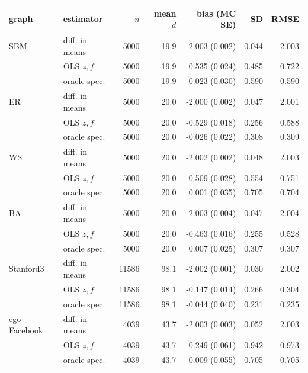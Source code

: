 \begin{tabular}{llrrrrr}
\toprule
graph & estimator & $n$ & mean $d$ & bias (MC SE) & SD & RMSE \\
\midrule
SBM & diff. in means & 5000 & 19.9 & -2.003 (0.002) & 0.044 & 2.003 \\
 & OLS $z,f$ & 5000 & 19.9 & -0.535 (0.024) & 0.485 & 0.722 \\
 & oracle spec. & 5000 & 19.9 & -0.023 (0.030) & 0.590 & 0.590 \\
\addlinespace
ER & diff. in means & 5000 & 20.0 & -2.000 (0.002) & 0.047 & 2.001 \\
 & OLS $z,f$ & 5000 & 20.0 & -0.529 (0.018) & 0.256 & 0.588 \\
 & oracle spec. & 5000 & 20.0 & -0.026 (0.022) & 0.308 & 0.309 \\
\addlinespace
WS & diff. in means & 5000 & 20.0 & -2.002 (0.002) & 0.048 & 2.003 \\
 & OLS $z,f$ & 5000 & 20.0 & -0.509 (0.028) & 0.554 & 0.751 \\
 & oracle spec. & 5000 & 20.0 & 0.001 (0.035) & 0.705 & 0.704 \\
\addlinespace
BA & diff. in means & 5000 & 20.0 & -2.003 (0.004) & 0.047 & 2.004 \\
 & OLS $z,f$ & 5000 & 20.0 & -0.463 (0.016) & 0.255 & 0.528 \\
 & oracle spec. & 5000 & 20.0 & 0.007 (0.025) & 0.307 & 0.307 \\
\addlinespace
Stanford3 & diff. in means & 11586 & 98.1 & -2.002 (0.001) & 0.030 & 2.002 \\
 & OLS $z,f$ & 11586 & 98.1 & -0.147 (0.014) & 0.266 & 0.304 \\
 & oracle spec. & 11586 & 98.1 & -0.044 (0.040) & 0.231 & 0.235 \\
\addlinespace
ego-Facebook & diff. in means & 4039 & 43.7 & -2.003 (0.003) & 0.052 & 2.003 \\
 & OLS $z,f$ & 4039 & 43.7 & -0.249 (0.061) & 0.942 & 0.973 \\
 & oracle spec. & 4039 & 43.7 & -0.009 (0.055) & 0.705 & 0.705 \\
\bottomrule
\end{tabular}
